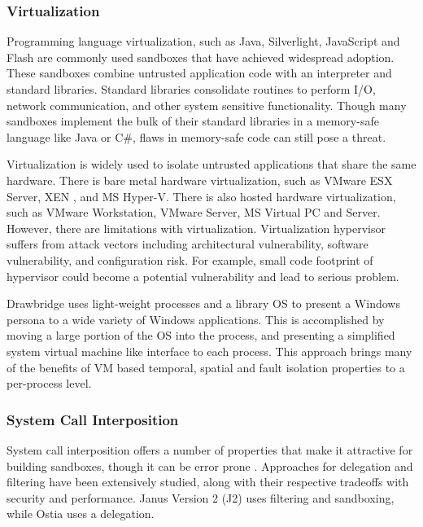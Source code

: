 \subsubsection{Virtualization}

Programming language virtualization, such as Java, Silverlight, JavaScript and Flash are commonly used sandboxes that 
have achieved widespread adoption. These sandboxes combine untrusted application code with an interpreter and 
standard libraries. Standard libraries consolidate routines to perform I/O, network communication, and other system sensitive 
functionality. Though many sandboxes implement the bulk of their standard libraries in a memory-safe language like 
Java or C\#, flaws in memory-safe code can still pose a threat.

Virtualization is widely used to isolate untrusted applications that share the same hardware. There is bare metal hardware 
virtualization, such as VMware ESX Server, XEN \cite{Xen:03}, and MS Hyper-V. There is also hosted hardware virtualization, 
such as VMware Workstation, VMware Server, MS Virtual PC and Server. However, there are limitations with virtualization. 
Virtualization hypervisor suffers from attack vectors including architectural vulnerability, software vulnerability, 
and configuration risk. For example, small code footprint of hypervisor could become a potential vulnerability 
and lead to serious problem.

Drawbridge \cite{Drawbridge:11} uses light-weight processes and a library OS to present a Windows persona to 
a wide variety of Windows applications. This is accomplished by moving a large portion of the OS into the process, 
and presenting a simplified system virtual machine like interface to each process. This approach brings many of 
the benefits of VM based temporal, spatial and fault isolation properties to a per-process level.


\subsubsection{System Call Interposition}

System call interposition offers a number of properties that make it attractive for building sandboxes, 
though it can be error prone \cite{SCI:04}. Approaches for delegation and filtering have been extensively studied, 
along with their respective tradeoffs with security and performance. Janus Version 2 (J2) \cite{Janus0:96, Janus:99} 
uses filtering and sandboxing, while Ostia \cite{SCI:04} uses a delegation.

